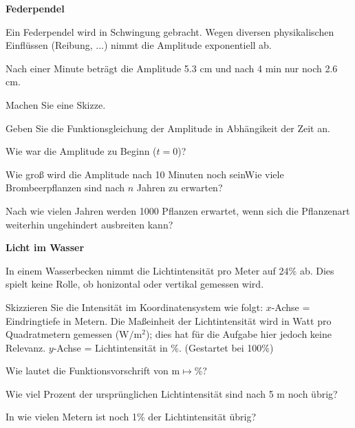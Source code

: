 

\bbwActAufgabenNr{} \textbf{Federpendel}

Ein Federpendel wird in Schwingung gebracht. Wegen diversen
physikalischen Einflüssen (Reibung, ...) nimmt die Amplitude
exponentiell ab.

Nach einer Minute beträgt die Amplitude 5.3 cm und nach 4 min nur noch
2.6 cm.

\begin{bbwAufgabenBlock}

\item Machen Sie eine Skizze.
\item Geben Sie die Funktionsgleichung der Amplitude in Abhängikeit
der Zeit an.
      
\item Wie war die Amplitude zu Beginn ($t=0$)?

\item Wie groß wird die Amplitude nach 10 Minuten noch seinWie viele Brombeerpflanzen sind nach $n$ Jahren zu erwarten?
\item Nach wie vielen Jahren werden 1000 Pflanzen erwartet, wenn sich die Pflanzenart weiterhin ungehindert ausbreiten kann?
\end{bbwAufgabenBlock}
\platzFuerBerechnungenBisEndeSeite{}





\bbwActAufgabenNr{} \textbf{Licht im Wasser}

In einem Wasserbecken nimmt die Lichtintensität pro Meter auf 24\% ab.
Dies spielt keine Rolle, ob honizontal oder vertikal gemessen wird.


\begin{bbwAufgabenBlock}

\item Skizzieren Sie die Intensität im Koordinatensystem wie folgt:
   $x$-Achse = Eindringtiefe in Metern. Die Maßeinheit der
   Lichtintensität wird in Watt pro Quadratmetern gemessen ($\textrm{W}/\textrm{m}^2$); dies
   hat für die Aufgabe hier jedoch keine Relevanz.
   $y$-Achse = Lichtintensität in \%. (Gestartet bei 100\%)
\item Wie lautet die Funktionsvorschrift von $\textrm{m}\mapsto \%$?
\item Wie viel Prozent der ursprünglichen Lichtintensität sind nach 5
   m noch übrig? 

\item In wie vielen Metern ist noch 1\% der Lichtintensität übrig?
\end{bbwAufgabenBlock}
\platzFuerBerechnungenBisEndeSeite{}


\newpage
